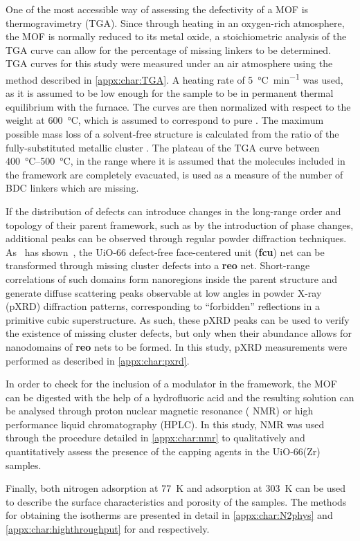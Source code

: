 One of the most accessible way of assessing the defectivity of
a MOF is thermogravimetry (TGA). Since through heating in
an oxygen-rich atmosphere, the MOF is normally reduced to
its metal oxide, a stoichiometric analysis of the TGA curve
can allow for the percentage of missing linkers to be
determined. TGA curves for this study were measured under
an air atmosphere using the method described in \autoref{appx:char:TGA}.
A heating rate of \SI{5}{\degreeCelsius\per\minute} was used,
as it is assumed to be low enough for the sample to be in
permanent thermal equilibrium with the furnace.
The curves are then normalized with respect to the weight at
\SI{600}{\degreeCelsius}, which is assumed to correspond to pure
. The maximum possible mass loss of a solvent-free
structure is calculated from the ratio of the fully-substituted
metallic cluster . The plateau
of the TGA curve between \SIrange{400}{500}{\degreeCelsius},
in the range where it is assumed that the molecules included in
the framework are completely evacuated, is used as a measure of the
number of BDC linkers which are missing.

If the distribution of defects can introduce changes in the
long-range order and topology of their parent framework,
such as by the introduction of phase changes,
additional peaks can be observed through regular
powder diffraction techniques.
As~\citeauthor{cliffeCorrelatedDefectNanoregions2014} has
shown~\cite{cliffeCorrelatedDefectNanoregions2014},
the UiO-66 defect-free face-centered unit (\textbf{fcu})
net can be transformed through missing cluster defects into
a \textbf{reo} net. Short-range correlations of such domains
form nanoregions inside the parent structure and generate
diffuse scattering peaks observable at low angles in
powder X-ray (pXRD) diffraction patterns, corresponding to ``forbidden''
reflections in a primitive cubic superstructure.
As such, these pXRD peaks can be used to verify the existence of
missing cluster defects, but only when their abundance allows for
nanodomains of \textbf{reo} nets to be formed. In this study,
pXRD measurements were performed as described in \autoref{appx:char:pxrd}.

In order to check for the inclusion of a modulator in the framework,
the MOF can be digested with the help of a hydrofluoric acid and the
resulting solution can be analysed through proton nuclear magnetic 
resonance ( NMR) or high performance liquid chromatography
(HPLC). In this study,  NMR was used through the procedure detailed
in \autoref{appx:char:nmr} to qualitatively and quantitatively assess
the presence of the capping agents in the UiO-66(Zr) samples. 

Finally, both nitrogen adsorption at \SI{77}{\kelvin} and  
adsorption at \SI{303}{\kelvin} can be used to describe the surface 
characteristics and porosity of the samples. The methods for obtaining
the isotherms are presented in detail in \autoref{appx:char:N2phys}
and \autoref{appx:char:highthroughput} for  and 
respectively.
